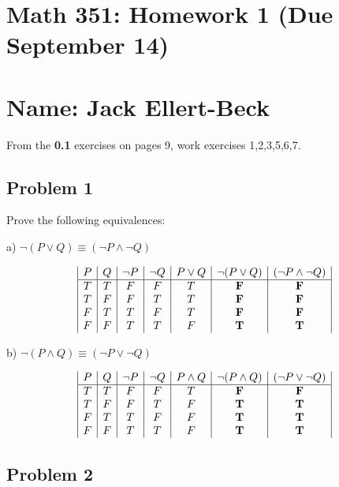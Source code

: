 \documentclass[11pt]{article}
\begin{document}
\setlength{\parindent}{0pt}
\setlength{\parskip}{9pt}


\section*{Math 351: Homework 1 (Due September 14)}
\section*{Name: Jack Ellert-Beck}

\bigskip

From the {\bf 0.1} exercises on pages 9, work exercises 1,2,3,5,6,7.

\subsection*{Problem 1}

Prove the following equivalences:

a) $\lnot (P \lor Q) \equiv (\neg P \land \lnot Q)$

$$
\begin{array}{|c|c|c|c|c|c|c|}
P & Q & \lnot P & \lnot Q & P \lor Q & \lnot (P \lor Q) & (\lnot P \land \lnot Q) \\
\hline
T & T & F & F & T & \bf F & \bf F \\
T & F & F & T & T & \bf F & \bf F \\
F & T & T & F & T & \bf F & \bf F \\
F & F & T & T & F & \bf T & \bf T \\
\end{array}
$$

b) $\lnot (P \land Q) \equiv (\lnot P \lor \lnot Q)$

$$
\begin{array}{|c|c|c|c|c|c|c|}
P & Q & \lnot P & \lnot Q & P \land Q & \lnot (P \land Q) & (\lnot P \lor \lnot Q) \\
\hline
T & T & F & F & T & \bf F & \bf F \\
T & F & F & T & F & \bf T & \bf T \\
F & T & T & F & F & \bf T & \bf T \\
F & F & T & T & F & \bf T & \bf T \\
\end{array}
$$

\subsection*{Problem 2}
\end{document}
